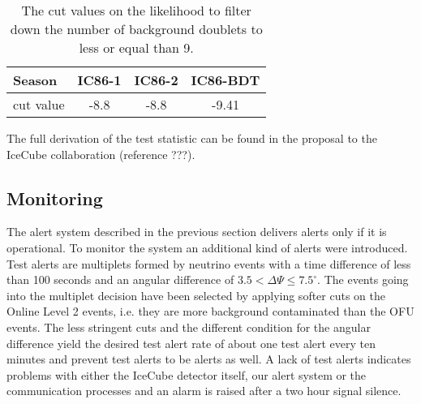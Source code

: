 \begin{table}[h]
  \centering
  \begin{tabular}{l|c|c|c}
   Season & IC86-1 & IC86-2 & IC86-BDT \\
\hline
   cut value & -8.8  & -8.8 & -9.41 \\
  \end{tabular}
  \caption{The cut values on the likelihood to filter down the number of
background doublets to less or equal than 9.}
  \label{tab:llh cut values}
\end{table}
The full derivation of the test statistic can be found in the proposal to the 
IceCube collaboration (reference ???).


\subsection{Monitoring}
The alert system described in the previous section delivers alerts only if it 
is operational. To monitor the system an additional kind of alerts were 
introduced.
Test 
alerts are multiplets formed by neutrino events with a time 
difference of less than 100 seconds and an angular difference of $3.5 < \Delta 
\Psi \leq 7.5^\circ$. The events going into the multiplet decision have been 
selected by applying softer cuts on the Online Level 2 events, i.e. they are 
more background contaminated than the OFU events. The less stringent cuts and 
the different condition for the angular difference yield the desired test alert 
rate of about one test alert every ten minutes and prevent test alerts to be 
alerts as well. A lack of test alerts indicates problems with either the 
IceCube detector itself, our alert system or the communication processes and an 
alarm is raised after a two hour signal silence.
